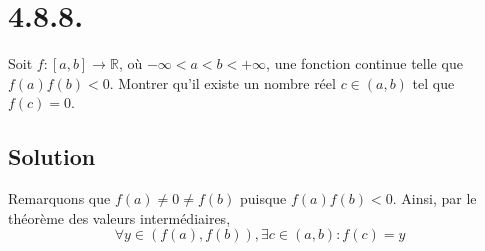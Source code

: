 \section*{4.8.8.}
 	Soit $f:[a,b]\longrightarrow\mathbb{R}$, où $-\infty<a<b<+\infty$, une fonction continue telle que $f(a)f(b)<0$. Montrer qu'il existe un nombre réel $c\in (a,b)$ tel que $f(c)=0$.
 \subsection*{Solution}
 	Remarquons que $f(a)\neq 0 \neq f(b)$ puisque $f(a)f(b)<0$. Ainsi, par le théorème des valeurs intermédiaires,
 	\[\forall y\in(f(a),f(b)), \exists c\in (a,b) : f(c)=y\]
